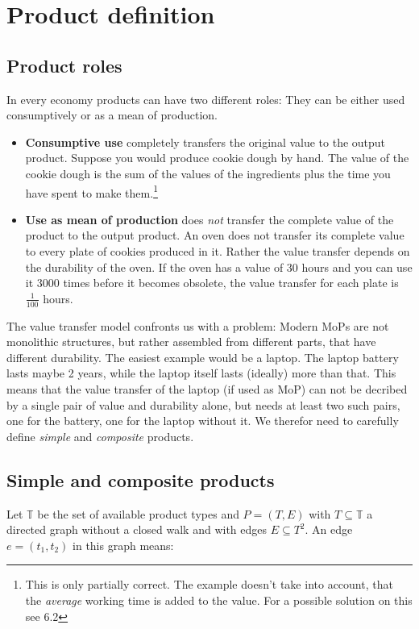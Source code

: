 \documentclass[11pt]{article}
\begin{document}
\section{Product definition}

\subsection{Product roles}

In every economy products can have two different roles: They can be either used consumptively or as a mean of production.
\begin{itemize}
\item \textbf{Consumptive use} completely transfers the original value to the output product. Suppose you would produce cookie dough by hand. The value of the cookie dough is the sum of the values of the ingredients plus the time you have spent to make them.\footnote{This is only partially correct. The example doesn't take into account, that the \emph{average} working time is added to the value. For a possible solution on this see 6.2}
\item \textbf{Use as mean of production} does \emph{not} transfer the complete value of the product to the output product. An oven does not transfer its complete value to every plate of cookies produced in it. Rather the value transfer depends on the durability of the oven. If the oven has a value of 30 hours and you can use it 3000 times before it becomes obsolete, the value transfer for each plate is $\frac{1}{100}$ hours. 
\end{itemize}

The value transfer model confronts us with a problem: Modern MoPs are not monolithic structures, but rather assembled from different parts, that have different durability. The easiest example would be a laptop. The laptop battery lasts maybe 2 years, while the laptop itself lasts (ideally) more than that. This means that the value transfer of the laptop (if used as MoP) can not be decribed by a single pair of value and durability alone, but needs at least two such pairs, one for the battery, one for the laptop without it. We therefor need to carefully define \emph{simple} and \emph{composite} products.

\subsection{Simple and composite products}

Let $\mathbb{T}$ be the set of available product types and $P=(T, E)$ with $T \subseteq \mathbb{T}$ a directed graph without a closed walk and with edges $E \subseteq T^2$. An edge $e=(t_1, t_2)$ in this graph means:
\end{document}
